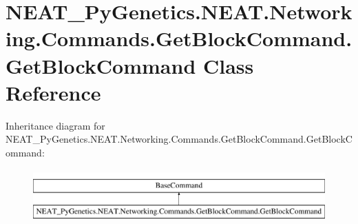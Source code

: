 \hypertarget{class_n_e_a_t___py_genetics_1_1_n_e_a_t_1_1_networking_1_1_commands_1_1_get_block_command_1_1_get_block_command}{}\section{N\+E\+A\+T\+\_\+\+Py\+Genetics.\+N\+E\+A\+T.\+Networking.\+Commands.\+Get\+Block\+Command.\+Get\+Block\+Command Class Reference}
\label{class_n_e_a_t___py_genetics_1_1_n_e_a_t_1_1_networking_1_1_commands_1_1_get_block_command_1_1_get_block_command}
Inheritance diagram for N\+E\+A\+T\+\_\+\+Py\+Genetics.\+N\+E\+A\+T.\+Networking.\+Commands.\+Get\+Block\+Command.\+Get\+Block\+Command\+:\begin{figure}[H]
\begin{center}
\leavevmode
\includegraphics[height=2.000000cm]{class_n_e_a_t___py_genetics_1_1_n_e_a_t_1_1_networking_1_1_commands_1_1_get_block_command_1_1_get_block_command}
\end{center}
\end{figure}
